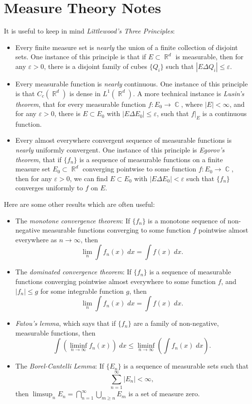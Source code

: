 \documentclass{exam}
\DeclareMathOperator{\CC}{\mathbb{C}}
\DeclareMathOperator{\RR}{\mathbb{R}}
\theoremstyle{problemstyle}
\newcommand{\1}[1]{\textbf{1}_{\left[#1\right]}} %
\begin{document}
\newpage
\section{Measure Theory Notes}

It is useful to keep in mind \emph{Littlewood's Three Principles}:
%
\begin{itemize}
	\item Every finite measure set is \emph{nearly} the union of a finite collection of disjoint sets. One instance of this principle is that if $E \subset \RR^d$ is measurable, then for any $\varepsilon > 0$, there is a disjoint family of cubes $\{ Q_i \}$ such that $|E \Delta Q_i| \leq \varepsilon$.

	\item Every measurable function is \emph{nearly} continuous. One instance of this principle is that $C_c(\RR^d)$ is dense in $L^1(\RR^d)$. A more technical instance is \emph{Lusin's theorem}, that for every measurable function $f: E_0 \to \CC$, where $|E| < \infty$, and for any $\varepsilon > 0$, there is $E \subset E_0$ with $|E \Delta E_0| \leq \varepsilon$, such that $f|_E$ is a continuous function.

	\item Every almost everywhere convergent sequence of measurable functions is \emph{nearly} uniformly convergent. One instance of this principle is \emph{Egorov's theorem}, that if $\{ f_n \}$ is a sequence of measurable functions on a finite measure set $E_0 \subset \RR^d$ converging pointwise to some function $f: E_0 \to \CC$, then for any $\varepsilon > 0$, we can find $E \subset E_0$ with $|E \Delta E_0| < \varepsilon$ such that $\{ f_n \}$ converges uniformly to $f$ on $E$.
\end{itemize}
%
Here are some other results which are often useful:
%
\begin{itemize}
	\item The \emph{monotone convergence theorem}: If $\{ f_n \}$ is a monotone sequence of non-negative measurable functions converging to some function $f$ pointwise almost everywhere as $n \to \infty$, then
	\[ \lim_n \int f_n(x)\; dx = \int f(x)\; dx. \]

	\item The \emph{dominated convergence theorem}: If $\{ f_n \}$ is a sequence of measurable functions converging pointwise almost everywhere to some function $f$, and $|f_n| \leq g$ for some integrable function $g$, then
	\[ \lim_n \int f_n(x)\; dx = \int f(x)\; dx. \]

	\item \emph{Fatou's lemma}, which says that if $\{ f_n \}$ are a family of non-negative, measurable functions, then
	\[ \int \left( \liminf_{n \to \infty} f_n(x) \right)\; dx \leq \liminf_{n \to \infty} \left( \int f_n(x)\; dx \right). \]

	\item The \emph{Borel-Cantelli Lemma}: If $\{ E_n \}$ is a sequence of measurable sets such that
	\[ \sum_{n = 1}^\infty |E_n| < \infty, \]
	then $\limsup_n E_n = \bigcap_{n = 1}^\infty \bigcup_{m \geq n} E_m$ is a set of measure zero.
\end{itemize}
\end{document}
